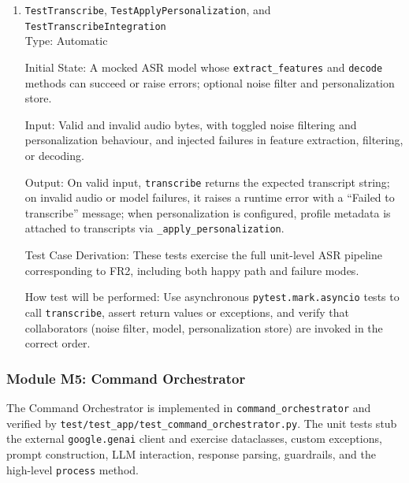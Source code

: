 \documentclass[12pt, titlepage]{article}
\begin{document}
\begin{enumerate}
\item{\texttt{TestTranscribe}, \texttt{TestApplyPersonalization}, and \texttt{TestTranscribeIntegration}\\}
Type: Automatic

Initial State: A mocked ASR model whose \texttt{extract\_features} and \texttt{decode} methods can succeed or raise errors; optional noise filter and personalization store.

Input: Valid and invalid audio bytes, with toggled noise filtering and personalization behaviour, and injected failures in feature extraction, filtering, or decoding.

Output: On valid input, \texttt{transcribe} returns the expected transcript string; on invalid audio or model failures, it raises a runtime error with a ``Failed to transcribe'' message; when personalization is configured, profile metadata is attached to transcripts via \texttt{\_apply\_personalization}.

Test Case Derivation: These tests exercise the full unit-level ASR pipeline corresponding to FR2, including both happy path and failure modes.

How test will be performed: Use asynchronous \texttt{pytest.mark.asyncio} tests to call \texttt{transcribe}, assert return values or exceptions, and verify that collaborators (noise filter, model, personalization store) are invoked in the correct order.
\end{enumerate}

\subsubsection{Module M5: Command Orchestrator}

The Command Orchestrator is implemented in \texttt{command\_orchestrator} and verified by \texttt{test/test\_app/test\_command\_orchestrator.py}. The unit tests stub the external \texttt{google.genai} client and exercise dataclasses, custom exceptions, prompt construction, LLM interaction, response parsing, guardrails, and the high-level \texttt{process} method.
\end{document}
